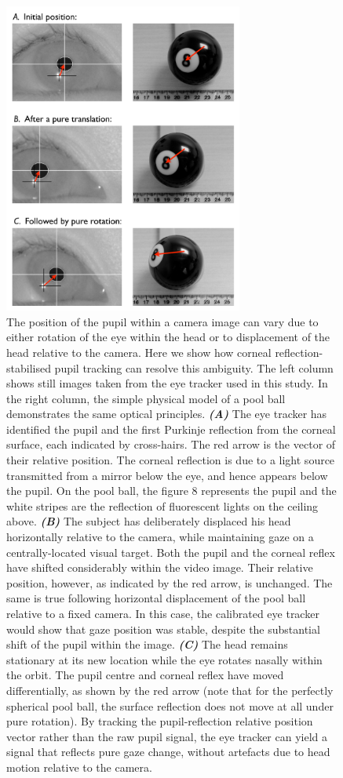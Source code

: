 \documentclass[jou,a4paper]{apa6}
\begin{document}
\begin{figure}[htbp]
\begin{center}
\includegraphics [width=0.70\textwidth]{Figures/Figure_1_Explanatory}
\caption{The position of the pupil within a camera image can vary due to either rotation of the eye within the head or to displacement of the head relative to the camera. Here we show how corneal reflection-stabilised pupil tracking can resolve this ambiguity. The left column shows still images taken from the eye tracker used in this study. In the right column, the simple physical model of a pool ball demonstrates the same optical principles. \textbf{\textit{(A)}} The eye tracker has identified the pupil and the first Purkinje reflection from the corneal surface, each indicated by cross-hairs. The red arrow is the vector of their relative position. The corneal reflection is due to a light source transmitted from a mirror below the eye, and hence appears below the pupil. On the pool ball, the figure 8 represents the pupil and the white stripes are the reflection of fluorescent lights on the ceiling above. \textbf{\textit{(B)}} The subject has deliberately displaced his head horizontally relative to the camera, while maintaining gaze on a centrally-located visual target. Both the pupil and the corneal reflex have shifted considerably within the video image. Their relative position, however, as indicated by the red arrow, is unchanged. The same is true following horizontal displacement of the pool ball relative to a fixed camera. In this case, the calibrated eye tracker would show that gaze position was stable, despite the substantial shift of the pupil within the image. \textbf{\textit{(C)}} The head remains stationary at its new location while the eye rotates nasally within the orbit. The pupil centre and corneal reflex have moved differentially, as shown by the red arrow (note that for the perfectly spherical pool ball, the surface reflection does not move at all under pure rotation). By tracking the pupil-reflection relative position vector rather than the raw pupil signal, the eye tracker can yield a signal that reflects pure gaze change, without artefacts due to head motion relative to the camera.}

\end{center}
\end{figure}
\end{document}
